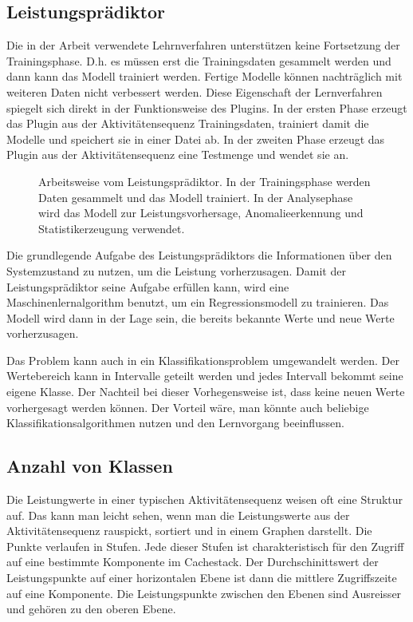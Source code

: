 \subsection{Leistungsprädiktor}
Die in der Arbeit verwendete Lehrnverfahren unterstützen keine Fortsetzung der Trainingsphase.
D.h. es müssen erst die Trainingsdaten gesammelt werden und dann kann das Modell trainiert werden.
Fertige Modelle können nachträglich mit weiteren Daten nicht verbessert werden.
Diese Eigenschaft der Lernverfahren spiegelt sich direkt in der Funktionsweise des Plugins. 
In der ersten Phase  erzeugt das Plugin aus der Aktivitätensequenz Trainingsdaten, trainiert damit die Modelle und speichert sie in einer Datei ab.
In der zweiten Phase erzeugt das Plugin aus der Aktivitätensequenz eine Testmenge und wendet sie an.

\begin{figure}[ht]
	\hfill
	\subfigure[Training]{
		
		\label{fig:des:perf_training}
	}
	\hfill
	\subfigure[Vorhersage]{
		
		\label{fig:des:perf_prediction}
	}
	\hfill
	\label{fig:des:perf_phases}
	\caption{Arbeitsweise vom Leistungsprädiktor. In der Trainingsphase werden Daten gesammelt und das Modell trainiert. In der Analysephase wird das Modell zur Leistungsvorhersage, Anomalieerkennung und Statistikerzeugung verwendet.}
\end{figure}

Die grundlegende Aufgabe des Leistungsprädiktors die Informationen über den Systemzustand zu nutzen, um die Leistung vorherzusagen.
Damit der Leistungsprädiktor seine Aufgabe erfüllen kann, wird eine Maschinenlernalgorithm benutzt, um ein Regressionsmodell zu trainieren.
Das Modell wird dann in der Lage sein, die bereits bekannte Werte und neue Werte vorherzusagen.

Das Problem kann auch in ein Klassifikationsproblem umgewandelt werden. 
Der Wertebereich kann in Intervalle geteilt werden und jedes Intervall bekommt seine eigene Klasse.
Der Nachteil bei dieser Vorhegensweise ist, dass keine neuen Werte vorhergesagt werden können.
Der Vorteil wäre, man könnte auch beliebige Klassifikationsalgorithmen nutzen und den Lernvorgang beeinflussen.

\subsection{Anzahl von Klassen}
Die Leistungwerte in einer typischen Aktivitätensequenz weisen oft eine Struktur auf.
Das kann man leicht sehen, wenn man die Leistungswerte aus der Aktivitätensequenz rauspickt, sortiert und in einem Graphen darstellt.
Die Punkte verlaufen in Stufen.
Jede dieser Stufen ist charakteristisch für den Zugriff auf eine bestimmte Komponente im Cachestack.
Der Durchschinittswert der Leistungspunkte auf einer horizontalen Ebene ist dann die mittlere Zugriffszeite auf eine Komponente.
Die Leistungspunkte zwischen den Ebenen sind Ausreisser und gehören zu den oberen Ebene.

